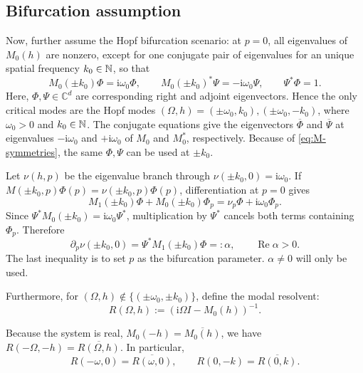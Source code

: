 \documentclass[11pt]{article}
\newcommand{\ii}{\mathrm{i}}
\DeclareMathOperator{\RePart}{Re}
\begin{document}
\subsection{Bifurcation assumption}
Now, further assume the Hopf bifurcation scenario: at $p=0$, all eigenvalues of $M_0(h)$ are nonzero, except 
for one conjugate pair of eigenvalues for an unique spatial frequency $k_0\in \mathbb{N}$, so that
\begin{equation}
 M_0(\pm k_0)\Phi=\ii\omega_0\Phi,
 \qquad
 M_0(\pm k_0)^*\Psi=-\ii\omega_0\Psi,
 \qquad
 \Psi^*\Phi=1.
 \label{eq:Hopf_assumption}
\end{equation}
Here, $\Phi,\Psi\in\mathbb C^d$ are corresponding right and adjoint eigenvectors. Hence the only critical modes are the Hopf modes  $(\Omega,h)=(\pm\omega_0, k_0),(\pm\omega_0, -k_0)$, where $\omega_0>0$ and
 $k_0\in \mathbb{N}$.
The conjugate equations give the eigenvectors $\overline\Phi$ and
$\overline\Psi$ at eigenvalues $-\ii\omega_0$ and $+\ii\omega_0$ of
$M_0$ and $M_0^*$, respectively.  Because of
\eqref{eq:M-symmetries}, the same $\Phi,\Psi$ can be used at $\pm k_0$.


Let $\nu(h,p)$ be the eigenvalue branch through
$\nu(\pm k_0,0)=\ii\omega_0$.  If
$M(\pm k_0,p)\Phi(p)=\nu(\pm k_0,p)\Phi(p)$, differentiation at $p=0$
gives
\begin{equation}
 M_1(\pm k_0)\Phi+M_0(\pm k_0)\Phi_p
 =\nu_p\Phi+\ii\omega_0\Phi_p.
 \label{eq:eigenvalue-differentiation}
\end{equation}
Since $\Psi^*M_0(\pm k_0)=\ii\omega_0\Psi^*$, multiplication by $\Psi^*$
cancels both terms containing $\Phi_p$.  Therefore
\begin{equation}
 \partial_p\nu(\pm k_0,0)
 =\Psi^*M_1(\pm k_0)\Phi=: \alpha,
 \qquad \RePart\alpha>0.
 \label{eq:transversality}
\end{equation}
The last inequality is to set $p$ as the bifurcation parameter. 
$\alpha\ne0$ will only  be used.

Furthermore, for $(\Omega,h)\notin \{(\pm \omega_0, \pm k_0)\}$,
define the modal resolvent:
\begin{equation}
 R(\Omega,h):=\left(\ii\Omega I-M_0(h)\right)^{-1}.
 \label{eq:resolvent}
\end{equation}

Because the system is real,
$M_0(-h)=\overline{M_0(h)}$, we have $ R(-\Omega,-h)=\overline{R(\Omega,h)}$.
In particular,
\begin{equation}
 R(-\omega,0)=\overline{R(\omega,0)},
 \qquad
 R(0,-k)=\overline{R(0,k)}.
 \label{eq:forcing-resolvent-conjugacy}
\end{equation}
\end{document}
